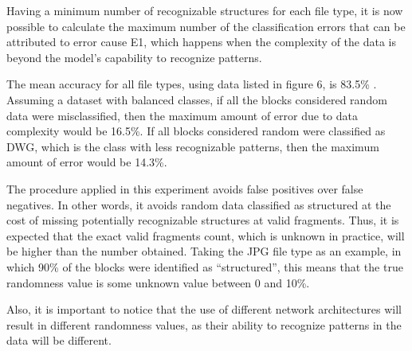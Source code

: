 Having a minimum number of recognizable structures for each file type, it is now possible to calculate the maximum number of the classification errors that can be attributed to error cause E1, which happens when the complexity of the data is beyond the model’s capability to recognize patterns.

The mean accuracy for all file types, using data listed in figure 6, is 83.5\% .  Assuming a dataset with balanced classes, if all the blocks considered random data were misclassified, then the maximum amount of error due to data complexity would be 16.5\%. If all blocks considered random were classified as DWG, which is the class with less recognizable patterns, then the maximum amount of error would be 14.3\%.


The procedure applied in this experiment avoids false positives over false negatives. In other words, it avoids random data classified as structured at the cost of missing potentially recognizable structures at valid fragments. Thus, it is expected that the exact valid fragments count, which is unknown in practice, will be higher than the number obtained. Taking the JPG file type as an example, in which 90\% of the blocks were identified as ``structured'', this means that the true randomness value is some unknown value between 0 and 10\%.

Also, it is important to notice that the use of different network architectures will result in different randomness values, as their ability to recognize patterns in the data will be different.

